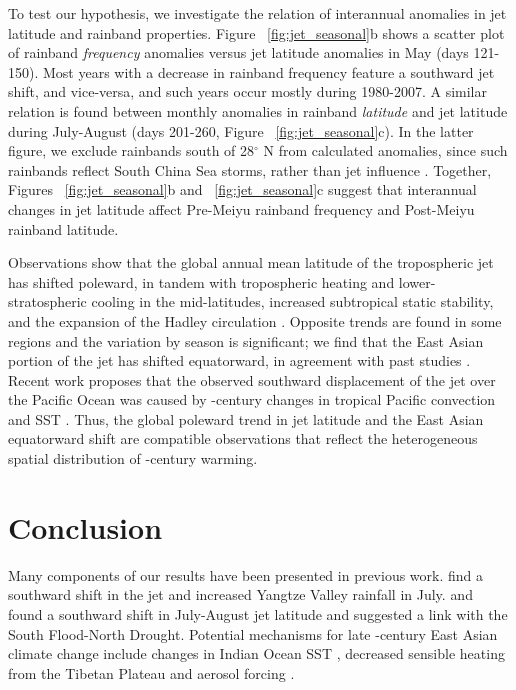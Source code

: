 	To test our hypothesis, we investigate the relation of interannual anomalies in jet latitude and rainband properties. Figure ~\ref{fig:jet_seasonal}b shows a scatter plot of rainband \textit{frequency} anomalies versus jet latitude anomalies in May (days 121-150). Most years with a decrease in rainband frequency feature a southward jet shift, and vice-versa, and such years occur mostly during 1980-2007. A similar relation is found between monthly anomalies in rainband \textit{latitude} and jet latitude during July-August (days 201-260, Figure ~\ref{fig:jet_seasonal}c). In the latter figure, we exclude rainbands south of 28$^{\circ}$ N from calculated anomalies, since such rainbands reflect South China Sea storms, rather than jet influence \citep{Day2015}. Together, Figures ~\ref{fig:jet_seasonal}b and ~\ref{fig:jet_seasonal}c suggest that interannual changes in jet latitude affect Pre-Meiyu rainband frequency and Post-Meiyu rainband latitude.

	 Observations show that the global annual mean latitude of the tropospheric jet has shifted poleward, in tandem with tropospheric heating and lower-stratospheric cooling in the mid-latitudes, increased subtropical static stability, and the expansion of the Hadley circulation \citep{Fu2006,Archer2008,Fu2011}. Opposite trends are found in some regions and the variation by season is significant; we find that the East Asian portion of the jet has shifted equatorward, in agreement with past studies \citep{Yu2007, Archer2008}. Recent work proposes that the observed southward displacement of the jet over the Pacific Ocean was caused by -century changes in tropical Pacific convection and SST \citep{Park2014a}. Thus, the global poleward trend in jet latitude and the East Asian equatorward shift are compatible observations that reflect the heterogeneous spatial distribution of -century warming.
	 	 
\section{Conclusion}

	Many components of our results have been presented in previous work. \citet{Xuan2011} find a southward shift in the jet and increased Yangtze Valley rainfall in July. \citet{Yu2004} and \citet{Yu2007} found a southward shift in July-August jet latitude and suggested a link with the South Flood-North Drought. Potential mechanisms for late -century East Asian climate change include changes in Indian Ocean SST \citep{Qu2012}, decreased sensible heating from the Tibetan Plateau \citep{Liu2012a,Hu2015} and aerosol forcing \citep{Song2014}. 
	

